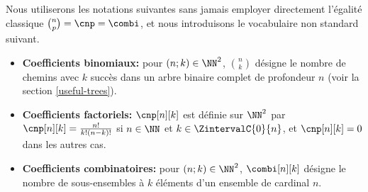 Nous utiliserons les notations suivantes sans jamais employer directement l'égalité classique $\binom{n}{p} = \cnp = \combi$,
et nous introduisons le vocabulaire non standard suivant.
%
\begin{itemize}
	\item \textbf{Coefficients binomiaux:}
    pour $(n;k) \in \NN^2$,
    $\binom{n}{k}$ désigne le nombre de chemins avec $k$ succès dans un arbre binaire complet de profondeur $n$ (voir la section  \ref{useful-trees}).


	\item \textbf{Coefficients factoriels:}
    $\cnp[n][k]$ est définie sur $\NN^2$ par
	$\cnp[n][k] = \frac{n!}{k!(n-k)!}$ si $n \in \NN$ et $k \in \ZintervalC{0}{n}$,
	et
	$\cnp[n][k] = 0$ dans les autres cas.


	\item \textbf{Coefficients combinatoires:}
    pour $(n;k) \in \NN^2$,
    $\combi[n][k]$ désigne le nombre de sous-ensembles à $k$ éléments d'un ensemble de cardinal $n$.
\end{itemize}